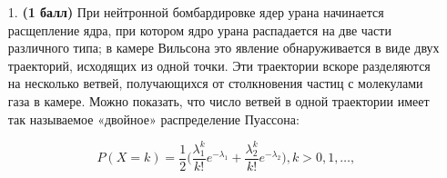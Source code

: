 \documentclass{assignment}
\begin{document}

\begin{enumerate}
    \item[1.] \textbf{(1 балл)}  При нейтронной бомбардировке ядер урана начинается расщепление ядра, при котором ядро урана распадается на две части различного типа; в камере Вильсона это явление обнаруживается в виде двух траекторий, исходящих из одной точки. Эти траектории вскоре разделяются на несколько ветвей, получающихся от столкновения частиц с молекулами газа в камере. Можно показать, что число ветвей в одной траектории имеет так называемое «двойное» распределение Пуассона:

    $$P(X = k) = \frac{1}{2}\Big(\frac{\lambda_1^k}{k!}e^{-\lambda_1} + \frac{\lambda_2^k}{k!}e^{-\lambda_2} \Big), k > 0, 1, \ldots,$$


\end{enumerate}
\end{document}
